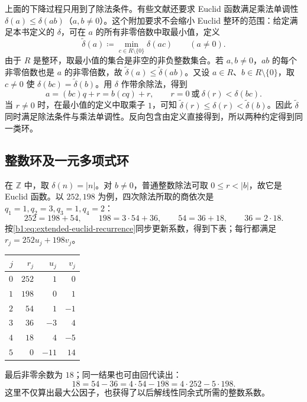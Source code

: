 上面的下降过程只用到了除法条件。有些文献还要求 Euclid 函数满足乘法单调性 \(\delta(a)\leq\delta(ab)\)（\(a,b\ne0\)）。这个附加要求不会缩小 Euclid 整环的范围：给定满足本书定义的 \(\delta\)，可在 \(a\) 的所有非零倍数中取最小值，定义
\[
	\widetilde\delta(a)\coloneqq\min_{c\in R\setminus\{0\}}\delta(ac) \qquad(a\ne0).
\]
由于 \(R\) 是整环，取最小值的集合是非空的非负整数集合。若 \(a,b\ne0\)，\(ab\) 的每个非零倍数也是 \(a\) 的非零倍数，故 \(\widetilde\delta(a)\leq\widetilde\delta(ab)\)。又设 \(a\in R\)、\(b\in R\setminus\{0\}\)，取 \(c\ne0\) 使 \(\delta(bc)=\widetilde\delta(b)\)。用 \(\delta\) 作带余除法，得到
\[
	a=(bc)q+r=b(cq)+r, \qquad r=0\ \text{或}\ \delta(r)<\delta(bc).
\]
当 \(r\ne0\) 时，在最小值的定义中取乘子 \(1\)，可知 \(\widetilde\delta(r)\leq\delta(r)<\widetilde\delta(b)\)。因此 \(\widetilde\delta\) 同时满足除法条件与乘法单调性\cite[Theorem 2.1]{ConradRemarksEuclideanDomains}。反向包含由定义直接得到，所以两种约定得到同一类环。

\subsection{整数环及一元多项式环}
\label{b1:subsec:1102:02}

在 \(\mathbb Z\) 中，取 \(\delta(n)=\lvert n\rvert\)。对 \(b\ne0\)，普通整数除法可取 \(0\leq r<\lvert b\rvert\)，故它是 Euclid 函数。以 \(252,198\) 为例，四次除法所取的商依次是 \(q_1=1,q_2=3,q_3=1,q_4=2\)：
\[
	252=198+54,\qquad 198=3\cdot54+36,\qquad 54=36+18,\qquad36=2\cdot18.
\]
按\eqref{b1:eq:extended-euclid-recurrence}同步更新系数，得到下表；每行都满足 \(r_j=252u_j+198v_j\)。
\begin{center}
	\begin{tabular}{rrrr}
		\toprule
		\(j\) & \(r_j\) & \(u_j\) & \(v_j\) \\
		\midrule
		\(0\) & \(252\) & \(1\) & \(0\) \\
		\(1\) & \(198\) & \(0\) & \(1\) \\
		\(2\) & \(54\) & \(1\) & \(-1\) \\
		\(3\) & \(36\) & \(-3\) & \(4\) \\
		\(4\) & \(18\) & \(4\) & \(-5\) \\
		\(5\) & \(0\) & \(-11\) & \(14\) \\
		\bottomrule
	\end{tabular}
\end{center}
最后非零余数为 \(18\)；同一结果也可由回代读出：
\begin{equation}\label{b1:eq:integer-bezout-example}
	18=54-36=4\cdot54-198=4\cdot252-5\cdot198.
\end{equation}
这里不仅算出最大公因子，也获得了以后解线性同余式所需的整数系数。

